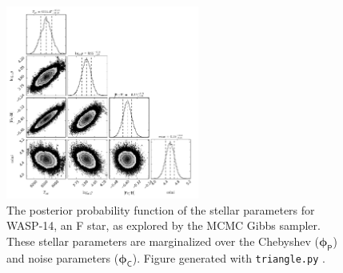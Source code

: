\documentclass[iop,floatfix]{emulateapj}
\newcommand{\Z}{[{\rm Fe}/{\rm H}]}
\newcommand{\vp}{ {\bm \phi}}
\newcommand{\cheb}{ \vp_{\mathsf{P}}}
\newcommand{\cov}{ \vp_{\mathsf{C}}}
\newcommand{\todo}[1]{ \textcolor{blue}{\\TODO: #1}}
\begin{document}


\begin{figure}[!htb]
\begin{center}
  \includegraphics[draft, width=2.5in]{figs/stellar_triangle_Kurucz.png}
  \caption{The posterior probability function of the stellar parameters for WASP-14, an F star, as explored by the MCMC Gibbs sampler. These stellar parameters are marginalized over the Chebyshev ($\cheb$) and noise parameters ($\cov$). Figure generated with \texttt{triangle.py} \citep{foreman-mackey14}.
}
\label{fig:stellar_posterior}
\end{center}
\end{figure}
\end{document}
